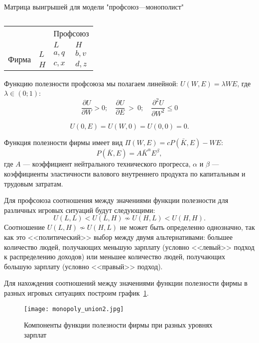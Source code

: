 \begin{table}[h]
	\centering
	\caption{}
		Матрица выигрышей для модели "профсоюз---монополист"\\
		\normalsize
	\begin{tabular}{|l|l|l|l|}
		\hline
		\multicolumn{2}{|l|}{\multirow{2}{*}{}} & \multicolumn{2}{l|}{Профсоюз} \\ \cline{3-4} 
		\multicolumn{2}{|l|}{}                  & $L$            & $H$            \\ \hline
		\multirow{2}{*}{Фирма}     & $L$     & $a,q$          & $b,v$          \\ \cline{2-4} 
		& $H$     & $c,x$          & $d,z$          \\ \hline
	\end{tabular}
	\label{tab:mono:prof}
\end{table}
Функцию полезности профсоюза мы полагаем линейной: $U(W,E)=\lambda WE$, где $\lambda \in(0;1)$:
$$
	\frac{\partial U}{\partial W} > 0; 
	\quad 
	\frac{\partial U}{\partial E}~>~0 ; 
	\quad
	\frac{\partial^2 U}{\partial W^2} \leqslant 0
$$

$$
	U(0,E) = U(W,0) = U(0,0) = 0.
$$

Функция полезности фирмы имеет вид $\Pi(W,E)=cP(\bar{K},E)-WE$:
$$P(\bar{K}, E)=A\bar{K}^\alpha E^\beta,$$ 
где $A$ --- коэффициент нейтрального технического прогресса, $\alpha$ и $\beta$
--- коэффициенты эластичности валового внутреннего продукта по капитальным и
трудовым затратам.

Для профсоюза соотношения между значениями функции полезности для различных игровых ситуаций
будут следующими:
\begin{equation}
U(L,L) < U(L,H) \nsim U(H, L) < U(H,H).
\end{equation}
Соотношение $U(L,H) \nsim U(H, L)$ не может быть определенно однозначно, так
как это <<политический>> выбор между двумя альтернативами: большее количество
людей, получающих меньшую зарплату (условно <<левый>> подход к распределению
доходов) или меньшее количество людей, получающих большую зарплату (условно
<<правый>> подход). 

Для нахождения соотношений между значениями функции полезности фирмы в разных игровых ситуациях
построим график~\ref{fig:monopoly_union1}.

\begin{figure}[h]
	\texttt{[image: monopoly\_union2.jpg]}
	\caption{Компоненты функции полезности фирмы при разных уровнях зарплат}
	\label{fig:monopoly_union1}
\end{figure}

